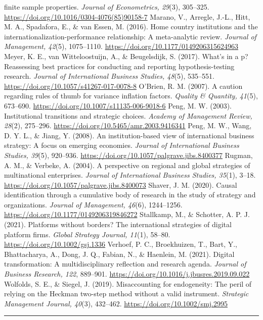 \documentclass[12pt,a4paper]{article}
\begin{document}
finite sample properties. \emph{Journal of Econometrics, 29}(3),
305--325. \url{https://doi.org/10.1016/0304-4076(85)90158-7} Marano, V.,
Arregle, J.-L., Hitt, M. A., Spadafora, E., \& van Essen, M. (2016).
Home country institutions and the internationalization-performance
relationship: A meta-analytic review. \emph{Journal of Management,
42}(5), 1075--1110. \url{https://doi.org/10.1177/0149206315624963}
Meyer, K. E., van Witteloostuijn, A., \& Beugelsdijk, S. (2017). What's
in a p? Reassessing best practices for conducting and reporting
hypothesis-testing research. \emph{Journal of International Business
Studies, 48}(5), 535--551.
\url{https://doi.org/10.1057/s41267-017-0078-8} O'Brien, R. M. (2007). A
caution regarding rules of thumb for variance inflation factors.
\emph{Quality \& Quantity, 41}(5), 673--690.
\url{https://doi.org/10.1007/s11135-006-9018-6} Peng, M. W. (2003).
Institutional transitions and strategic choices. \emph{Academy of
Management Review, 28}(2), 275--296.
\url{https://doi.org/10.5465/amr.2003.9416341} Peng, M. W., Wang, D. Y.
L., \& Jiang, Y. (2008). An institution-based view of international
business strategy: A focus on emerging economies. \emph{Journal of
International Business Studies, 39}(5), 920--936.
\url{https://doi.org/10.1057/palgrave.jibs.8400377} Rugman, A. M., \&
Verbeke, A. (2004). A perspective on regional and global strategies of
multinational enterprises. \emph{Journal of International Business
Studies, 35}(1), 3--18.
\url{https://doi.org/10.1057/palgrave.jibs.8400073} Shaver, J. M.
(2020). Causal identification through a cumulative body of research in
the study of strategy and organizations. \emph{Journal of Management,
46}(6), 1244--1256. \url{https://doi.org/10.1177/0149206319846272}
Stallkamp, M., \& Schotter, A. P. J. (2021). Platforms without borders?
The international strategies of digital platform firms. \emph{Global
Strategy Journal, 11}(1), 58--80. \url{https://doi.org/10.1002/gsj.1336}
Verhoef, P. C., Broekhuizen, T., Bart, Y., Bhattacharya, A., Dong, J.
Q., Fabian, N., \& Haenlein, M. (2021). Digital transformation: A
multidisciplinary reflection and research agenda. \emph{Journal of
Business Research, 122}, 889--901.
\url{https://doi.org/10.1016/j.jbusres.2019.09.022} Wolfolds, S. E., \&
Siegel, J. (2019). Misaccounting for endogeneity: The peril of relying
on the Heckman two-step method without a valid instrument.
\emph{Strategic Management Journal, 40}(3), 432--462.
\url{https://doi.org/10.1002/smj.2995}

\begin{center}\rule{0.5\linewidth}{0.5pt}\end{center}
\end{document}
